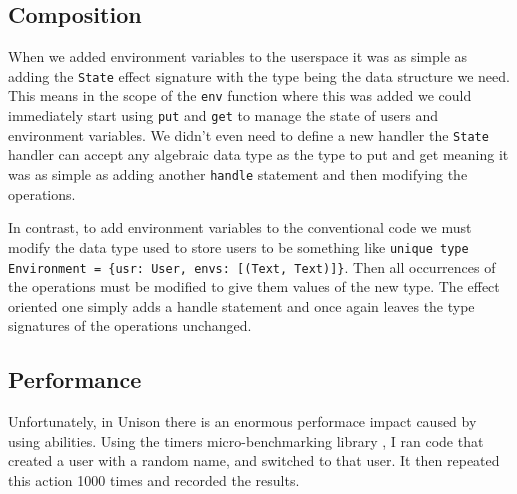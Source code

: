 \documentclass[logo,bsc,singlespacing,parskip]{infthesis}
\begin{document}
\subsection{Composition}

When we added environment variables to the userspace it was as simple as adding
the \texttt{State} effect signature with the type being the data structure we
need. This means in the scope of the \texttt{env} function where this was added
we could immediately start using \texttt{put} and \texttt{get} to manage the
state of users and environment variables. We didn't even need to define a new
handler the \texttt{State} handler can accept any algebraic data type as the
type to put and get meaning it was as simple as adding another \texttt{handle}
statement and then modifying the operations.

In contrast, to add environment variables to the conventional code we must
modify the data type used to store users to be something like \texttt{unique
type Environment = \{usr: User, envs: [(Text, Text)]\}}. Then all occurrences of
the operations must be modified to give them values of the new type. The effect
oriented one simply adds a handle statement and once again leaves the type
signatures of the operations unchanged.

\subsection{Performance}

Unfortunately, in Unison there is an enormous performace impact caused by using
abilities. Using the timers micro-benchmarking library \cite{timers}, I ran code
that created a user with a random name, and switched to that user. It then
repeated this action 1000 times and recorded the results.
\end{document}
